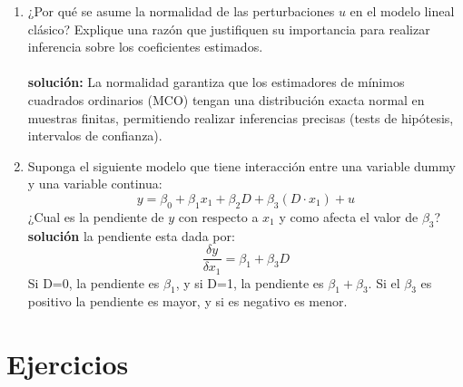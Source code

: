 \documentclass[10pt,a4paper]{article}
\begin{document}
\begin{enumerate}
\item ¿Por qué se asume la normalidad de las perturbaciones \(u\)
        en el modelo lineal clásico? Explique una razón   que justifiquen su importancia para realizar inferencia
        sobre los coeficientes estimados.
        \\
\\
\textbf{solución:} La normalidad garantiza que los estimadores de mínimos
                cuadrados ordinarios (MCO) tengan una distribución exacta
                normal en muestras finitas, permitiendo realizar inferencias
                precisas (tests de hipótesis, intervalos de confianza).

\item Suponga el siguiente modelo que tiene interacción entre una variable dummy y una variable continua:
$$y = \beta_0 + \beta_1 x_1 + \beta_2D+\beta_3(D\cdot x_1)+u$$
¿Cual es la pendiente de $y$ con respecto a $x_1$ y como afecta el valor de $\beta_3$?
\\
\textbf{solución} 
la pendiente esta dada por:
$$\frac{\delta y}{\delta x_1} = \beta_1 + \beta_3D$$
Si D=0, la pendiente es $\beta_1$, y si D=1, la pendiente es $\beta_1 + \beta_3$. Si el $\beta_3$ es positivo la pendiente es mayor, y si es negativo es menor.
\end{enumerate}

\section{Ejercicios}
\end{document}
